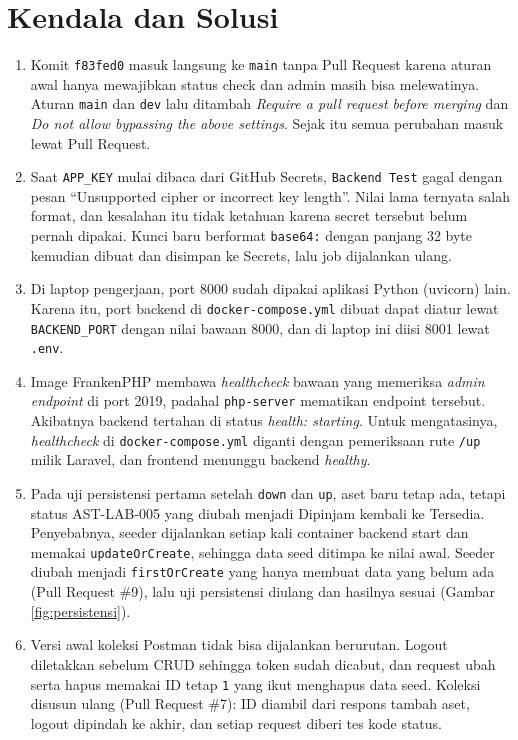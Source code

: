 \documentclass[a4paper,oneside,12pt]{report}
\begin{document}
\chapter{Kendala dan Solusi}
\begin{enumerate}
    \item Komit \texttt{f83fed0} masuk langsung ke \texttt{main} tanpa Pull Request karena aturan awal hanya mewajibkan status check dan admin masih bisa melewatinya. Aturan \texttt{main} dan \texttt{dev} lalu ditambah \textit{Require a pull request before merging} dan \textit{Do not allow bypassing the above settings}. Sejak itu semua perubahan masuk lewat Pull Request.
    \item Saat \texttt{APP\_KEY} mulai dibaca dari GitHub Secrets, \texttt{Backend Test} gagal dengan pesan ``Unsupported cipher or incorrect key length''. Nilai lama ternyata salah format, dan kesalahan itu tidak ketahuan karena secret tersebut belum pernah dipakai. Kunci baru berformat \texttt{base64:} dengan panjang 32 byte kemudian dibuat dan disimpan ke Secrets, lalu job dijalankan ulang.
    \item Di laptop pengerjaan, port 8000 sudah dipakai aplikasi Python (uvicorn) lain. Karena itu, port backend di \texttt{docker-compose.yml} dibuat dapat diatur lewat \texttt{BACKEND\_PORT} dengan nilai bawaan 8000, dan di laptop ini diisi 8001 lewat \texttt{.env}.
    \item Image FrankenPHP membawa \textit{healthcheck} bawaan yang memeriksa \textit{admin endpoint} di port 2019, padahal \texttt{php-server} mematikan endpoint tersebut. Akibatnya backend tertahan di status \textit{health: starting}. Untuk mengatasinya, \textit{healthcheck} di \texttt{docker-compose.yml} diganti dengan pemeriksaan rute \texttt{/up} milik Laravel, dan frontend menunggu backend \textit{healthy}.
    \item Pada uji persistensi pertama setelah \texttt{down} dan \texttt{up}, aset baru tetap ada, tetapi status AST-LAB-005 yang diubah menjadi Dipinjam kembali ke Tersedia. Penyebabnya, seeder dijalankan setiap kali container backend start dan memakai \texttt{updateOrCreate}, sehingga data seed ditimpa ke nilai awal. Seeder diubah menjadi \texttt{firstOrCreate} yang hanya membuat data yang belum ada (Pull Request \#9), lalu uji persistensi diulang dan hasilnya sesuai (Gambar \ref{fig:persistensi}).
    \item Versi awal koleksi Postman tidak bisa dijalankan berurutan. Logout diletakkan sebelum CRUD sehingga token sudah dicabut, dan request ubah serta hapus memakai ID tetap \texttt{1} yang ikut menghapus data seed. Koleksi disusun ulang (Pull Request \#7): ID diambil dari respons tambah aset, logout dipindah ke akhir, dan setiap request diberi tes kode status.
\end{enumerate}
\end{document}
